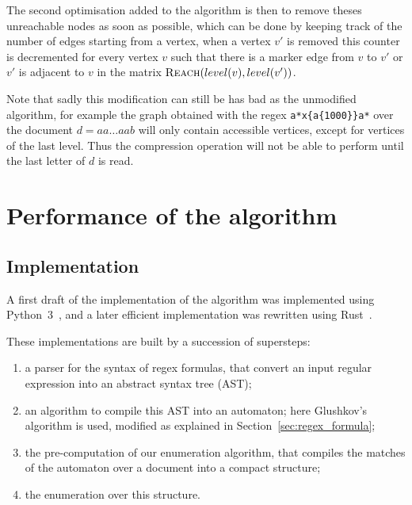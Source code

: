 \documentclass[12px]{article}
\theoremstyle{definition}
\begin{document}
        The second optimisation added to the algorithm is then to remove theses
        unreachable nodes as soon as possible, which can be done by keeping
        track of the number of edges starting from a vertex, when a vertex $v'$
        is removed this counter is decremented for every vertex $v$ such that
        there is a marker edge from $v$ to $v'$ or $v'$ is adjacent to $v$ in
        the matrix $\Call{Reach}{level(v), level(v')}$.

        Note that sadly this modification can still be has bad as the
        unmodified algorithm, for example the graph obtained with the regex
        \texttt{a*x\{a\{1000\}\}a*} over the document $d = aa \ldots aab$ will
        only contain accessible vertices, except for vertices of the last
        level.  Thus the compression operation will not be able to perform
        until the last letter of $d$ is read.

  \section{Performance of the algorithm}

    \subsection{Implementation}

      A first draft of the implementation of the algorithm was implemented
      using Python~3~\cite{implPython}, and a later efficient implementation
      was rewritten using Rust~\cite{implRust}.

      These implementations are built by a succession of supersteps:
      \begin{enumerate}
        \item a parser for the syntax of regex formulas, that convert an input
          regular expression into an abstract syntax tree (AST);
        \item an algorithm to compile this AST into an automaton; here
          Glushkov's algorithm is used, modified as explained in
          Section~\ref{sec:regex_formula};
        \item the pre-computation of our enumeration algorithm, that compiles
          the matches of the automaton over a document into a compact
          structure;
        \item the enumeration over this structure.
      \end{enumerate}
\end{document}
